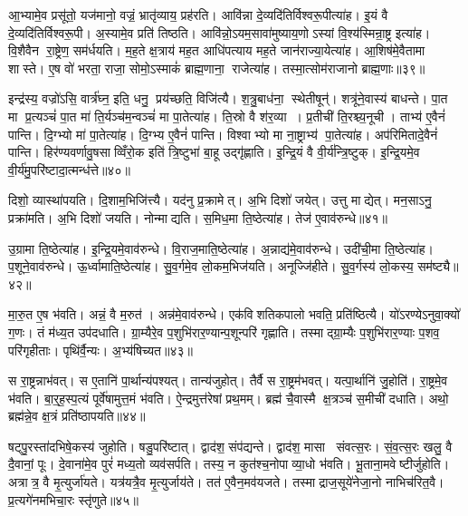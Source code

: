 आ॒भ्यामे॒व प्रसू॑तो॒ यज॑मानो॒ वज्रं॒ भ्रातृ॑व्याय॒ प्रह॑रति। आवि॑न्ना दे॒व्यदि॑तिर्विश्वरू॒पीत्या॑ह। इ॒यं वै दे॒व्यदि॑तिर्विश्वरू॒पी। अ॒स्यामे॒व प्रति॑ तिष्ठति। आवि॑न्नो॒ऽयम॒सावा॑मुष्याय॒णोऽस्यां वि॒श्य॑स्मिन्रा॒ष्ट्र इत्या॑ह। वि॒शैवैन रा॒ष्ट्रेण॒ सम॑र्धयति। म॒ह॒ते क्ष॒त्राय॑ मह॒त आधि॑पत्याय मह॒ते जान॑राज्या॒येत्या॑ह। आ॒शिष॑मे॒वैतामा शास्ते। ए॒ष वो॑ भरता॒ राजा॒ सोमो॒ऽस्माकं॑ ब्राह्म॒णाना॒ राजेत्या॑ह। तस्मा॒त्सोम॑राजानो ब्राह्म॒णाः॥३९॥

इन्द्र॑स्य॒ वज्रो॑ऽसि॒ वार्त्र॑घ्न॒ इति॒ धनु॒ प्रय॑च्छति॒ विजि॑त्यै। श॒त्रु॒बाध॑ना॒ स्थेतीषून्॑। शत्रू॑ने॒वास्य॑ बाधन्ते। पा॒त मा प्र॒त्यञ्चं॑ पा॒त मा॑ ति॒र्यञ्च॑म॒न्वञ्चं॑ मा पा॒तेत्या॑ह। ति॒स्रो वै श॑र॒व्या। प्र॒तीची॑ ति॒रश्च्य॒नूची। ताभ्य॑ ए॒वैनं॑ पान्ति। दि॒ग्भ्यो मा॑ पा॒तेत्या॑ह। दि॒ग्भ्य ए॒वैनं॑ पान्ति। विश्वाभ्यो मा ना॒ष्ट्राभ्य॑ पा॒तेत्या॑ह। अप॑रिमितादे॒वैनं॑ पान्ति। हिर॑ण्यवर्णावु॒षसाव्विँरो॒क इति॑ त्रि॒ष्टुभा॑ बा॒हू उद्गृ॑ह्णाति। इ॒न्द्रि॒यं वै वी॒र्य॑न्त्रि॒ष्टुक्। इ॒न्द्रि॒यमे॒व वी॒र्य॑मु॒परि॑ष्टादा॒त्मन्ध॑त्ते॥४०॥\anuvakamend[व्यावृ॑त्त्यै दा॒त्रम॒सीत्या॑हा॒मृत॒ हिर॑ण्यमेकश॒तो ग॑मय॒न्त्याह॑ ब्राह्म॒णा ना॒ष्ट्राभ्य॑ पा॒तेत्या॑ह च॒त्वारि॑ च]

दिशो॒ व्यास्था॑पयति। दि॒शाम॒भिजि॑त्त्यै। यद॑नु प्र॒क्रामेत्। अ॒भि दिशो॑ जयेत्। उत्तु माद्येत्। मन॒साऽनु॒ प्रक्रा॑मति। अ॒भि दिशो॑ जयति। नोन्माद्यति। स॒मिध॒मा ति॒ष्ठेत्या॑ह। तेज॑ ए॒वाव॑रुन्धे॥४१॥

उ॒ग्रामा ति॒ष्ठेत्या॑ह। इ॒न्द्रि॒यमे॒वाव॑रुन्धे। वि॒राज॒माति॒ष्ठेत्या॑ह। अ॒न्नाद्य॑मे॒वाव॑रुन्धे। उदी॑ची॒मा ति॒ष्ठेत्या॑ह। प॒शूने॒वाव॑रुन्धे। ऊ॒र्ध्वामाति॒ष्ठेत्या॑ह। सु॒व॒र्गमे॒व लो॒कम॒भिज॑यति। अनूज्जि॑हीते। सु॒व॒र्गस्य॑ लो॒कस्य॒ सम॑ष्ट्यै॥४२॥

मा॒रु॒त ए॒ष भ॑वति। अन्नं॒ वै म॒रुत॑। अन्न॑मे॒वाव॑रुन्धे। एक॑विशतिकपालो भवति॒ प्रति॑ष्ठित्यै। यो॑ऽरण्येऽनुवा॒क्यो॑ ग॒णः। तं म॑ध्य॒त उप॑दधाति। ग्रा॒म्यैरे॒व प॒शुभि॑रार॒ण्यान्प॒शून्परि॑ गृह्णाति। तस्माद्ग्रा॒म्यैः प॒शुभि॑रार॒ण्याः प॒शव॒ परि॑गृहीताः। पृथि॑र्वै॒न्यः। अ॒भ्य॑षिच्यत॥४३॥

स रा॒ष्ट्रन्नाभ॑वत्। स ए॒तानि॑ पा॒र्थान्य॑पश्यत्। तान्य॑जुहोत्। तैर्वै स रा॒ष्ट्रम॑भवत्। यत्पा॒र्थानि॑ जु॒होति॑। रा॒ष्ट्रमे॒व भ॑वति। बा॒र्॒ह॒स्प॒त्यं पूर्वे॑षामुत्त॒मं भ॑वति। ऐ॒न्द्रमुत्त॑रेषां प्रथ॒मम्। ब्रह्म॑ चै॒वास्मै क्ष॒त्रञ्च॑ स॒मीची॑ दधाति। अथो॒ ब्रह्म॑न्ने॒व क्ष॒त्रं प्रति॑ष्ठापयति॥४४॥

षट्पु॒रस्ता॑दभिषे॒कस्य॑ जुहोति। षडु॒परि॑ष्टात्। द्वाद॑श॒ संप॑द्यन्ते। द्वाद॑श॒ मासा संवत्स॒रः। सं॒व॒त्स॒रः खलु॒ वै दै॒वानां॒ पूः। दे॒वाना॑मे॒व पुरं॑ मध्य॒तो व्यव॑सर्पति। तस्य॒ न कुत॑श्च॒नोपाव्या॒धो भ॑वति। भू॒ताना॒मवेष्टीर्जुहोति। अत्रात्र॒ वै मृ॒त्युर्जा॑यते। यत्र॑यत्रै॒व मृ॒त्युर्जाय॑ते। तत॑ ए॒वैन॒मव॑यजते। तस्माद्राज॒सूये॑नेजा॒नो नाभिच॑रित॒वै। प्र॒त्यगे॑नमभिचा॒रः स्तृ॑णुते॥४५॥\anuvakamend[रु॒न्धे॒ सम॑ष्ट्या असिच्यत स्थापयति॒ जाय॑ते॒ पञ्च॑ च]

